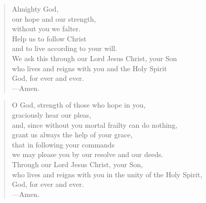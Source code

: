 \prayer

\setlength{\leftmargini}{\prayerleftmargini}

\begin{verse}
Almighty God,\\
our hope and our strength,\\
without you we falter.\\
Help us to follow Christ\\
and to live according to your will.\\
We ask this through our Lord Jesus Christ, your Son\\
who lives and reigns with you and the Holy Spirit\\
God, for ever and ever.\\
{\color{red}---\thinspace}Amen.
\end{verse}


\begin{verse}
O God, strength of those who hope in you,\\
graciously hear our pleas,\\
and, since without you mortal frailty can do nothing,\\
grant us always the help of your grace,\\
that in following your commands\\
we may please you by our resolve and our deeds.\\
Through our Lord Jesus Christ, your Son,\\
who lives and reigns with you in the unity of the Holy Spirit,\\
God, for ever and ever.\\
{\color{red}---\thinspace}Amen.
\end{verse}

\setlength{\leftmargini}{\defleftmargini}